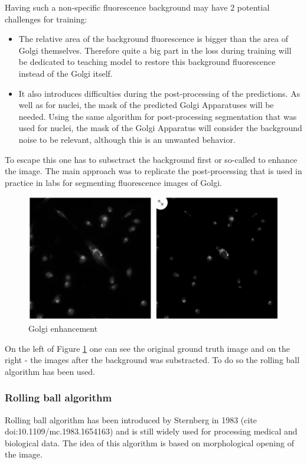 Having such a non-specific fluorescence background may have 2 potential challenges for training:
\begin{itemize}
    \item The relative area of the background fluorescence is bigger than the area of Golgi themselves. Therefore quite a big part in the loss during training will be dedicated to teaching model to restore this background fluorescence instead of the Golgi itself.
    \item It also introduces difficulties during the post-processing of the predictions. As well as for nuclei, the mask of the predicted Golgi Apparatuses will be needed. Using the same algorithm for post-processing segmentation that was used for nuclei, the mask of the Golgi Apparatus will consider the background noise to be relevant, although this is an unwanted behavior.
\end{itemize}

To escape this one has to subsctract the background first or so-called to enhance the image. The main approach was to replicate the post-processing that is used in practice in labs for segmenting fluorescence images of Golgi.

\begin{figure}[htb]
	\begin{center}
		\includegraphics[width=0.5\linewidth]{bilder/enhancement.jpg}
		\caption{Golgi enhancement}\label{fig:golgi-enhancement}
	\end{center}
\end{figure}

On the left of Figure \ref{fig:golgi-enhancement} one can see the original ground truth image and on the right - the images after the background was substracted. To do so the rolling ball algorithm has been used.

\subsubsection{Rolling ball algorithm}
Rolling ball algorithm has been introduced by Sternberg in 1983 (cite doi:10.1109/mc.1983.1654163) and is still widely used for processing medical and biological data. The idea of this algorithm is based on morphological opening of the image. 

